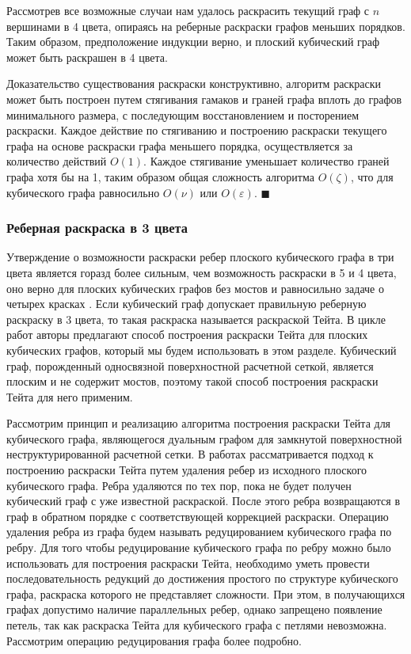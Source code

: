 Рассмотрев все возможные случаи нам удалось раскрасить текущий граф с $n$ вершинами в 4 цвета, опираясь на реберные раскраски графов меньших порядков.
Таким образом, предположение индукции верно, и плоский кубический граф может быть раскрашен в 4 цвета.

Доказательство существования раскраски конструктивно, алгоритм раскраски может быть построен путем стягивания гамаков и граней графа вплоть до графов минимального размера, с последующим восстановлением и посторением раскраски.
Каждое действие по стягиванию и построению раскраски текущего графа на основе раскраски графа меньшего порядка, осуществляется за количество действий $O(1)$.
Каждое стягивание уменьшает количество граней графа хотя бы на 1, таким образом общая сложность алгоритма $O(\zeta)$, что для кубического графа равносильно $O(\nu)$ или $O(\varepsilon)$.
$\blacksquare$\\

\subsubsection{Реберная раскраска в 3 цвета}

Утверждение о возможности раскраски ребер плоского кубического графа в три цвета является горазд более сильным, чем возможность раскраски в 5 и 4 цвета, оно верно для плоских кубических графов без мостов и равносильно задаче о четырех красках \cite{Soifer2009,Tait1880}.
Если кубический граф допускает правильную реберную раскраску в 3 цвета, то такая раскраска называется раскраской Тейта.
В цикле работ \cite{Kurapov2018,Kurapov2020,Kurapov2020Mono} авторы предлагают способ построения раскраски Тейта для плоских кубических графов, который мы будем использовать в этом разделе.
Кубический граф, порожденный односвязной поверхностной расчетной сеткой, является плоским и не содержит мостов, поэтому такой способ построения раскраски Тейта для него применим.

Рассмотрим принцип и реализацию алгоритма построения раскраски Тейта для кубического графа, являющегося дуальным графом для замкнутой поверхностной неструктурированной расчетной сетки.
В работах \cite{Kurapov2018,Kurapov2020} рассматривается подход к построению раскраски Тейта путем удаления ребер из исходного плоского кубического графа.
Ребра удаляются по тех пор, пока не будет получен кубический граф с уже известной раскраской.
После этого ребра возвращаются в граф в обратном порядке с соответствующей коррекцией раскраски.
Операцию удаления ребра из графа будем называть редуцированием кубического графа по ребру.
Для того чтобы редуцирование кубического графа по ребру можно было использовать для построения раскраски Тейта, необходимо уметь провести последовательность редукций до достижения простого по структуре кубического графа, раскраска которого не представляет сложности.
При этом, в получающихся графах допустимо наличие параллельных ребер, однако запрещено появление петель, так как раскраска Тейта для кубического графа с петлями невозможна.
Рассмотрим операцию редуцирования графа более подробно.

